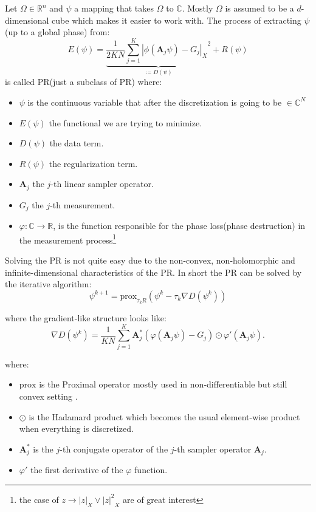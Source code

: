 Let $\Omega \in \mathbb{R}^n$ and $\psi$ a mapping that takes $\Omega$ to $\mathbb{C}$. Mostly $\Omega$ is assumed to be a 
$d$-dimensional cube which makes it easier to work with. The process of extracting $\psi$(up to a global phase) from:
\begin{equation}
	E(\psi) = \underbrace{\frac{1}{2KN} \sum_{j=1}^{K} {\left|\phi(\boldsymbol{A}_j\psi)-G_j\right|_X}^2}_{\coloneqq D(\psi)}+ R(\psi)
  \end{equation}
  is called \acl*{PR}(just a subclass of \acl*{PR}) where:
  \begin{itemize}
  \item $\psi$ is the continuous variable that after the discretization is going to be $\in \mathbb{C}^N$
	\item $E(\psi)$ the functional we are trying to minimize.
	\item $D(\psi)$ the data term.
	\item $R(\psi)$ the regularization term.
	\item $\boldsymbol{A}_j$ the $j$-th linear sampler operator.
	\item $G_j$ the $j$-th measurement.
	\item $\varphi \colon \mathbb{C} \rightarrow \mathbb{R}$, 
	is the function responsible for the phase loss(phase destruction) in the measurement process\footnote{the case of $z \rightarrow \left|z\right|_X \lor {\left|z\right|^2}_X$ are of great interest}
  \end{itemize}

Solving the \acl*{PR} is not quite easy due to the non-convex, non-holomorphic and infinite-dimensional characteristics of the \acl*{PR}. 
In short the \acl*{PR} can be solved by the iterative algorithm:
  \begin{equation}\label{eq:pr_solution}
	\psi^{k+1} = \text{prox}_{\tau_{k}R}(\psi^k-\tau_k\nabla{D(\psi^k)})
  \end{equation}

  where the gradient-like structure looks like: 
  \begin{equation}\label{eq:gradient_pr_solution}
	\nabla{D(\psi^k)} = \frac{1}{KN} \sum_{j=1}^{K} \boldsymbol{A}_j^*\left(\varphi\left(\boldsymbol{A}_j\psi\right)-G_j\right)\odot \varphi'(\boldsymbol{A}_j\psi).
  \end{equation}

  where:
  \begin{itemize}
	\item $\mathrm{prox}$ is the Proximal operator mostly used in non-differentiable but still convex setting \cite{Bredies2018}.
	\item $\odot$ is the Hadamard product which becomes the usual element-wise product\cite{Horn2012}\cite{Hackbusch2019} when everything is discretized.
	\item $\boldsymbol{A}^*_j$ is the $j$-th conjugate operator of the $j$-th sampler operator $\boldsymbol{A}_j$.
	\item $\varphi'$ the first derivative of the $\varphi$ function.
  \end{itemize}

